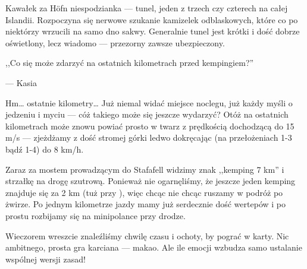 Kawałek za Höfn niespodzianka --- tunel, jeden z trzech czy czterech na całej Islandii. Rozpoczyna się nerwowe szukanie kamizelek odblaskowych, które co po niektórzy wrzucili na samo dno sakwy. Generalnie tunel jest krótki i dość dobrze oświetlony, lecz wiadomo --- przezorny zawsze ubezpieczony.

\epigraph{,,Co się może zdarzyć na ostatnich kilometrach przed kempingiem?''}{--- \textup{Kasia}}

Hm… ostatnie kilometry… Już niemal widać miejsce noclegu, już każdy myśli o jedzeniu i myciu --- cóż takiego może się jeszcze wydarzyć? Otóż na ostatnich kilometrach może znowu powiać prosto w twarz z prędkością dochodzącą do 15 m/s --- zjeżdżamy z dość stromej górki ledwo dokręcając (na przełożeniach 1-3 bądź 1-4) do 8 km/h.

Zaraz za mostem prowadzącym do Stafafell widzimy znak ,,kemping 7 km'' i strzałkę na drogę szutrową. Ponieważ nie ogarnęliśmy, że jeszcze jeden kemping znajduje się za 2 km (tuż przy ), więc chcąc nie chcąc ruszamy w podróż po żwirze. Po jednym kilometrze jazdy mamy już serdecznie dość wertepów i po prostu rozbijamy się na minipolance przy drodze.

Wieczorem wreszcie znaleźliśmy chwilę czasu i ochoty, by pograć w karty. Nic ambitnego, prosta gra karciana --- makao. Ale ile emocji wzbudza samo ustalanie wspólnej wersji zasad!

